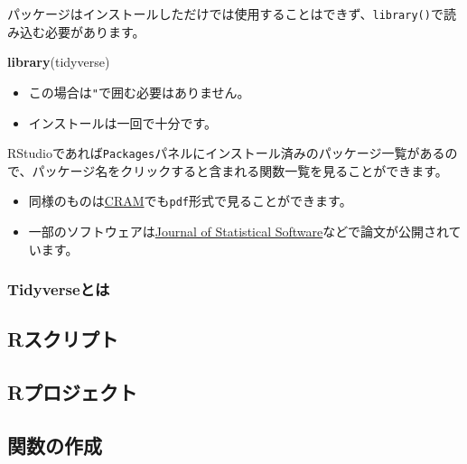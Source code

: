 \documentclass[]{bxjsarticle}
\newenvironment{Shaded}{\begin{snugshade}}{\end{snugshade}}
\newcommand{\KeywordTok}[1]{\textcolor[rgb]{0.13,0.29,0.53}{\textbf{#1}}}
\newcommand{\NormalTok}[1]{#1}
\providecommand{\tightlist}{%
  \setlength{\itemsep}{0pt}\setlength{\parskip}{0pt}}
\begin{document}
パッケージはインストールしただけでは使用することはできず、\texttt{library()}で読み込む必要があります。

\begin{Shaded}
\begin{Highlighting}[]
\KeywordTok{library}\NormalTok{(tidyverse)}
\end{Highlighting}
\end{Shaded}

\begin{itemize}
\tightlist
\item
  この場合は\texttt{"}で囲む必要はありません。
\item
  インストールは一回で十分です。
\end{itemize}

RStudioであれば\texttt{Packages}パネルにインストール済みのパッケージ一覧があるので、パッケージ名をクリックすると含まれる関数一覧を見ることができます。

\begin{itemize}
\tightlist
\item
  同様のものは\href{https://cran.r-project.org/}{CRAM}でも\texttt{pdf}形式で見ることができます。
\item
  一部のソフトウェアは\href{https://www.jstatsoft.org/index}{Journal of Statistical Software}などで論文が公開されています。
\end{itemize}

\hypertarget{tidyverseux3068ux306f}{%
\subsubsection{Tidyverseとは}\label{tidyverseux3068ux306f}}

\hypertarget{rux30b9ux30afux30eaux30d7ux30c8}{%
\subsection{Rスクリプト}\label{rux30b9ux30afux30eaux30d7ux30c8}}

\hypertarget{rux30d7ux30edux30b8ux30a7ux30afux30c8}{%
\subsection{Rプロジェクト}\label{rux30d7ux30edux30b8ux30a7ux30afux30c8}}

\hypertarget{ux95a2ux6570ux306eux4f5cux6210}{%
\subsection{関数の作成}\label{ux95a2ux6570ux306eux4f5cux6210}}
\end{document}
